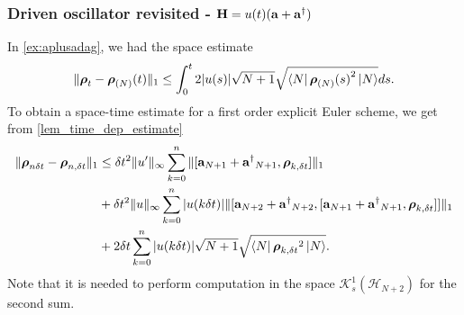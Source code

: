 \documentclass[a4paper,onecolumn,amsmath,amssymb,amsfonts,accepted=2026-03-06]{quantumarticle}
\newcommand{\xH}{\mathcal{H}}
\newcommand{\xK}{\mathcal{K}}
\newcommand{\Hamil}{{\bf H}}
\newcommand{\destroy}{{\bf a}}
\newcommand{\create}{{\bf a^\dag}}
\newcommand{\rN}{{\boldsymbol{\rho}_{(N)}}}
\begin{document}
\subsubsection{\texorpdfstring{Driven oscillator revisited - $\Hamil = u(t)(\destroy + \create)$}{Driven oscillator revisited}}
\label{ex:aplusadag_st}
In \cref{ex:aplusadag}, we had the space estimate
\begin{align}
    \|\boldsymbol{\rho}_t-\rN(t)\|_1 \leq \int_0^t 2|u(s)|\sqrt{N+1} \sqrt{\bra{N}{\rN(s)}^2 \ket{N}}ds.
\end{align}
To obtain a space-time estimate for a first order explicit Euler scheme, we get from \cref{lem_time_dep_estimate}
\begin{align}
    \notag \|\boldsymbol{\rho}_{n\delta t}-\boldsymbol{\rho}_{n,\delta t}\|_1 &\leq \delta t ^2 \|u'\|_\infty \sum_{k=0}^n \|[\destroy_{N+1}+\create_{N+1},\boldsymbol{\rho}_{k,\delta t}]\|_1\\
    \notag &+ \delta t ^2 \|u\|_\infty \sum_{k=0}^n |u(k\delta t)|\|[\destroy_{N+2}+\create_{N+2},[\destroy_{N+1}+\create_{N+1}, \boldsymbol{\rho}_{k,\delta t}]]\|_1\\
    &+2\delta t \sum_{k=0}^n |u(k\delta t)|\sqrt{N+1} \sqrt{\bra{N}{\boldsymbol{\rho}_{k,\delta t}}^2 \ket{N}}.
\end{align}
Note that it is needed to perform computation in the space $\xK^1_s(\xH_{N+2})$ for the second sum.
\end{document}
